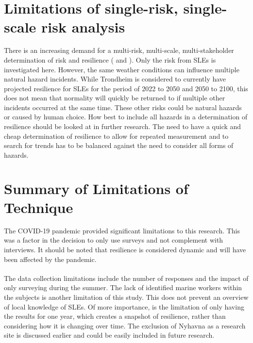 \section{Limitations of single-risk, single-scale risk analysis}
There is an increasing demand for a multi-risk, multi-scale, multi-stakeholder determination of risk and resilience (\cite{gerkensmeier_governing_2018} and \cite{cutter_community_2020}).  Only the risk from SLEs is investigated here. However, the same weather conditions can influence multiple natural hazard incidents. While Trondheim is considered to currently have projected resilience for SLEs for the period of 2022 to 2050 and 2050 to 2100, this does not mean that normality will quickly be returned to if multiple other incidents occurred at the same time. These other risks could be natural hazards or caused by human choice. How best to include all hazards in a determination of resilience should be looked at in further research. The need to have a quick and cheap determination of resilience to allow for repeated measurement and to search for trends has to be balanced against the need to consider all forms of hazards. 
\paragraph{}


\section{Summary of Limitations of Technique}
The COVID-19 pandemic provided significant limitations to this research. This was a factor in the decision to only use surveys and not complement with interviews. It should be noted that resilience is considered dynamic and will have been affected by the pandemic. 
\paragraph{}
The data collection limitations include the number of responses and the impact of only surveying during the summer. The lack of identified marine workers within the subjects is another limitation of this study. This does not prevent an overview of local knowledge of SLEs. Of more importance, is the limitation of only having the results for one year, which creates a snapshot of resilience, rather than considering how it is changing over time. The exclusion of Nyhavna as a research site is discussed earlier and could be easily included in future research. 


